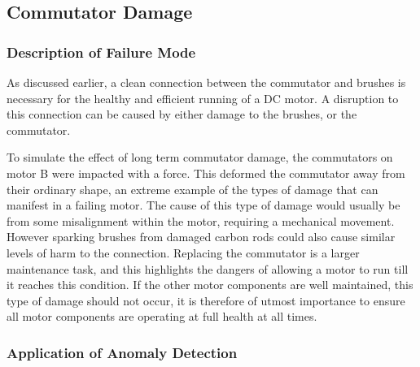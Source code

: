 \subsection{Commutator Damage}

\subsubsection{Description of Failure Mode}

As discussed earlier, a clean connection between the commutator and brushes is necessary for the healthy and efficient running of a DC motor. A disruption to this connection can be caused by either damage to the brushes, or the commutator. 


To simulate the effect of long term commutator damage, the commutators on motor B were impacted with a force. This deformed the commutator away from their ordinary shape, an extreme example of the types of damage that can manifest in a failing motor. The cause of this type of damage would usually be from some misalignment within the motor, requiring a mechanical movement. However sparking brushes from damaged carbon rods could also cause similar levels of harm to the connection. Replacing the commutator is a larger maintenance task, and this highlights the dangers of allowing a motor to run till it reaches this condition. If the other motor components are well maintained, this type of damage should not occur, it is therefore of utmost importance to ensure all motor components are operating at full health at all times.  

\subsubsection{Application of Anomaly Detection}


